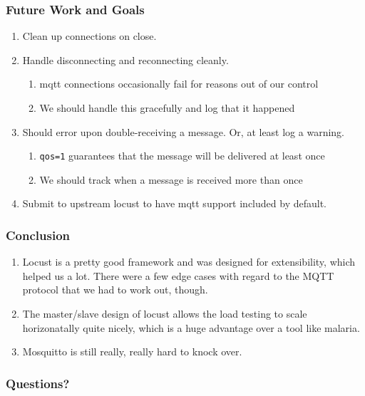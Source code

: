 \documentclass{beamer}
\begin{document}
\begin{frame}
    \frametitle{Future Work and Goals}
    \begin{enumerate}
        \item
            Clean up connections on close.
        \item
            Handle disconnecting and reconnecting cleanly.
            \begin{enumerate}
                \item
                    mqtt connections occasionally fail for reasons out of our
                    control
                \item We should handle this gracefully and log that it happened
            \end{enumerate}
        \item
            Should error upon double-receiving a message. Or, at least log a
            warning.
            \begin{enumerate}
                \item
                    \texttt{qos=1} guarantees that the message will be
                    delivered at least once
                \item We should track when a message is received more than once
            \end{enumerate}
        \item
            Submit to upstream locust to have mqtt support included by default.
    \end{enumerate}
\end{frame}

\begin{frame}
    \frametitle{Conclusion}
    \begin{enumerate}
        \item
            Locust is a pretty good framework and was designed for
            extensibility, which helped us a lot. There were a few edge cases
            with regard to the MQTT protocol that we had to work out, though.
        \item
            The master/slave design of locust allows the load testing to scale
            horizonatally quite nicely, which is a huge advantage over a tool
            like malaria.
        \item
            Mosquitto is still really, really hard to knock over.
    \end{enumerate}
\end{frame}

\begin{frame}
    \frametitle{Questions?}
\end{frame}
\end{document}
